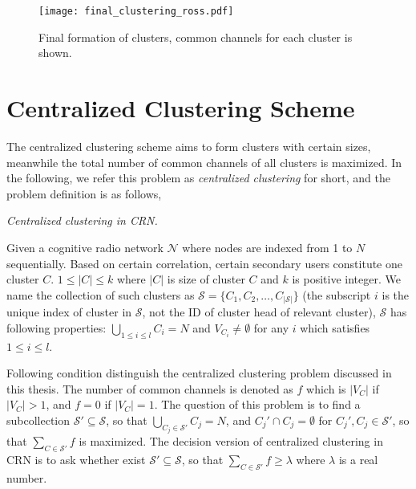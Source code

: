 \begin{figure}[ht!]
  \centering
  \texttt{[image: final\_clustering\_ross.pdf]}
  \caption{Final formation of clusters, common channels for each cluster is shown.}
  \label{fig4}
\end{figure}


\newpage
\section{Centralized Clustering Scheme}
\label{centralized_scheme}



The centralized clustering scheme aims to form clusters with certain sizes, meanwhile the total number of common channels of all clusters is maximized.
In the following, we refer this problem as \textit{centralized clustering} for short, and the problem definition is as follows, 


\begin{mydef}
\label{def_centralized_clustering}
\textit{Centralized clustering in CRN.}

Given a cognitive radio network $\mathcal{N}$ where nodes are indexed from 1 to $N$ sequentially.
Based on certain correlation, certain secondary users constitute one cluster $C$.
$1\leq |C| \leqslant k$ where $|C|$ is size of cluster $C$ and $k$ is positive integer.
We name the collection of such clusters as $\mathcal{S}=\{C_1, C_2,\ldots,C_{|\mathcal{S}|}\}$ (the subscript $i$ is the unique index of cluster in $\mathcal{S}$, not the ID of cluster head of relevant cluster), $\mathcal{S}$ has following properties: $\bigcup_{1\leq i \leq l} C_i = N$ and $V_{C_i}\neq \emptyset$ for any $i$ which satisfies $1\leq i \leq l$.

Following condition distinguish the centralized clustering problem discussed in this thesis.
The number of common channels is denoted as $f$ which is $|V_{C}|$ if $|V_{C}|>1$, and $f=0$ if $|V_{C}|=1$.
The question of this problem is to find a subcollection $\mathcal{S}' \subseteq \mathcal{S}$, so that $\bigcup_{C_j\in \mathcal{S}'} C_j = N$, and $C_j'\cap C_j =\emptyset$ for $C_j', C_j\in \mathcal{S}'$, so that $\sum_{C\in \mathcal{S}'} f$ is maximized.
The decision version of centralized clustering in CRN is to ask whether exist $\mathcal{S}'\subseteq \mathcal{S}$, so that $\sum_{C\in \mathcal{S}'} f \geqslant \lambda$ where $\lambda$ is a real number.%
\end{mydef}


